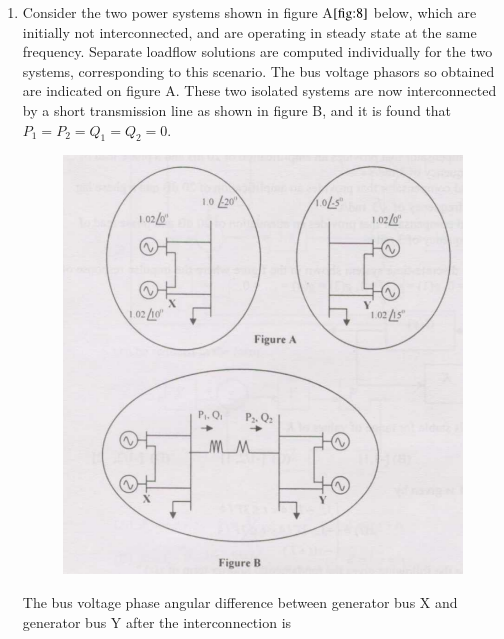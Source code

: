 \documentclass[journal]{IEEEtran}
\numberwithin{equation}{enumi}
\numberwithin{figure}{enumi}
\begin{document}
\begin{enumerate}
\begin{enumerate}
\end{enumerate}
\bigskip
\item Consider the two power systems shown in figure A$\ref{fig:8}$ below, which are initially not interconnected, and are operating in steady state at the same frequency. Separate loadflow solutions are computed individually for the two systems, corresponding to this scenario. The bus voltage phasors so obtained are indicated on figure A. These two isolated systems are now interconnected by a short transmission line as shown in figure B, and it is  found that $P_1=P_2=Q_1=Q_2=0$.
\begin{figure}[!ht]
    \centering
    \includegraphics[width=\linewidth]{figs/8.png}
    \caption{}
    \label{fig:8}
    \end{figure}
The bus voltage phase angular difference between generator bus X and generator bus Y after the interconnection is
\begin{enumerate}
\end{enumerate}
\end{enumerate}
\end{document}
